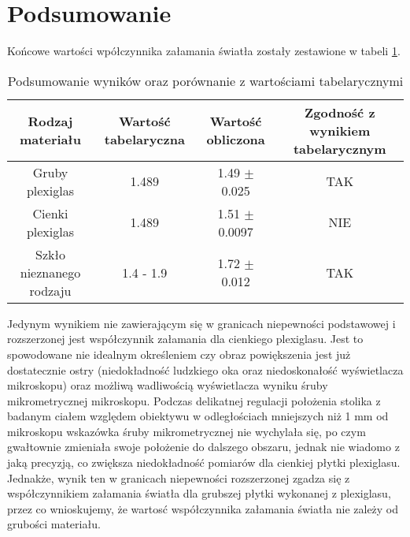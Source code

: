 \documentclass[a4paper,12pts]{article}
\begin{document}
	\section{Podsumowanie}
	Końcowe wartości wpółczynnika załamania światła zostały zestawione w tabeli \ref{podsumowanie_wynikow}.
	\begin{table}[!h]
		\centering
		\begin{tabular}{|c|c|c|c|}
			\hline
			Rodzaj materiału & Wartość tabelaryczna & Wartość obliczona & Zgodność z wynikiem tabelarycznym \\ \hline
			Gruby plexiglas & 1.489 & 1.49 $\pm$ 0.025 & TAK \\ \hline
			Cienki plexiglas & 1.489 & 1.51 $\pm$ 0.0097 & NIE \\ \hline
			Szkło nieznanego rodzaju & 1.4 - 1.9 & 1.72 $\pm$ 0.012 & TAK \\ \hline
		\end{tabular}
	\caption{Podsumowanie wyników oraz porównanie z wartościami tabelarycznymi}
	\label{podsumowanie_wynikow}
	\end{table}
	Jedynym wynikiem nie zawierającym się w granicach niepewności podstawowej i rozszerzonej jest współczynnik załamania dla cienkiego plexiglasu. Jest to spowodowane nie idealnym określeniem czy obraz powiększenia jest już dostatecznie ostry (niedokładność ludzkiego oka oraz niedoskonałość wyświetlacza mikroskopu) oraz możliwą wadliwością wyświetlacza wyniku śruby mikrometrycznej mikroskopu. Podczas delikatnej regulacji położenia stolika z badanym ciałem względem obiektywu w odległościach mniejszych niż 1 mm  od mikroskopu wskazówka śruby mikrometrycznej nie wychylała się, po czym gwałtownie zmieniała swoje położenie do dalszego obszaru, jednak nie wiadomo z jaką precyzją, co zwiększa niedokładność pomiarów dla cienkiej płytki plexiglasu. Jednakże, wynik ten w granicach niepewności rozszerzonej zgadza się z współczynnikiem załamania światła dla grubszej płytki wykonanej z plexiglasu, przez co wnioskujemy, że wartosć współczynnika załamania światła nie zależy od grubości materiału.
	
\end{document}
